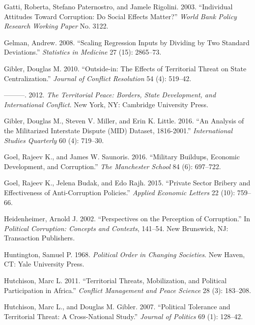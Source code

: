\documentclass[11pt,]{article}
\begin{document}
\hypertarget{ref-gattietal2003iatc}{}
Gatti, Roberta, Stefano Paternostro, and Jamele Rigolini. 2003.
``Individual Attitudes Toward Corruption: Do Social Effects Matter?''
\emph{World Bank Policy Research Working Paper} No. 3122.

\hypertarget{ref-gelman2008sri}{}
Gelman, Andrew. 2008. ``Scaling Regression Inputs by Dividing by Two
Standard Deviations.'' \emph{Statistics in Medicine} 27 (15): 2865--73.

\hypertarget{ref-gibler2010oi}{}
Gibler, Douglas M. 2010. ``Outside-in: The Effects of Territorial Threat
on State Centralization.'' \emph{Journal of Conflict Resolution} 54 (4):
519--42.

\hypertarget{ref-gibler2012tp}{}
---------. 2012. \emph{The Territorial Peace: Borders, State
Development, and International Conflict}. New York, NY: Cambridge
University Press.

\hypertarget{ref-gibleretal2016amid}{}
Gibler, Douglas M., Steven V. Miller, and Erin K. Little. 2016. ``An
Analysis of the Militarized Interstate Dispute (MID) Dataset,
1816-2001.'' \emph{International Studies Quarterly} 60 (4): 719--30.

\hypertarget{ref-goelsaunoris2016mbed}{}
Goel, Rajeev K., and James W. Saunoris. 2016. ``Military Buildups,
Economic Development, and Corruption.'' \emph{The Manchester School} 84
(6): 697--722.

\hypertarget{ref-goeletal2015psb}{}
Goel, Rajeev K., Jelena Budak, and Edo Rajh. 2015. ``Private Sector
Bribery and Effectiveness of Anti-Corruption Policies.'' \emph{Applied
Economic Letters} 22 (10): 759--66.

\hypertarget{ref-heidenheimer2002ppc}{}
Heidenheimer, Arnold J. 2002. ``Perspectives on the Perception of
Corruption.'' In \emph{Political Corruption: Concepts and Contexts},
141--54. New Brunswick, NJ: Transaction Publishers.

\hypertarget{ref-huntington1968pocs}{}
Huntington, Samuel P. 1968. \emph{Political Order in Changing
Societies}. New Haven, CT: Yale University Press.

\hypertarget{ref-hutchison2011ttm}{}
Hutchison, Marc L. 2011. ``Territorial Threats, Mobilization, and
Political Participation in Africa.'' \emph{Conflict Management and Peace
Science} 28 (3): 183--208.

\hypertarget{ref-hutchisongibler2007ptt}{}
Hutchison, Marc L., and Douglas M. Gibler. 2007. ``Political Tolerance
and Territorial Threat: A Cross-National Study.'' \emph{Journal of
Politics} 69 (1): 128--42.
\end{document}

